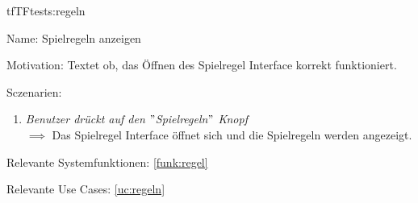 \begin{description}[leftmargin=5em, style=sameline]
\begin{lhp}{tf}{TF}{tests:regeln}
	\item [Name:] Spielregeln anzeigen
	\item [Motivation:] Textet ob, das Öffnen des Spielregel Interface korrekt funktioniert.
	\item [Sczenarien:] \hfill
		\begin{enumerate}
			\item \textit{Benutzer drückt auf den $"$Spielregeln$"$ Knopf} \\ $\implies$ Das Spielregel Interface öffnet sich und die Spielregeln werden angezeigt.
		\end{enumerate}
	\item [Relevante Systemfunktionen:] \ref{funk:regel}
	\item [Relevante Use Cases:] \ref{uc:regeln}
\end{lhp}


\end{description}